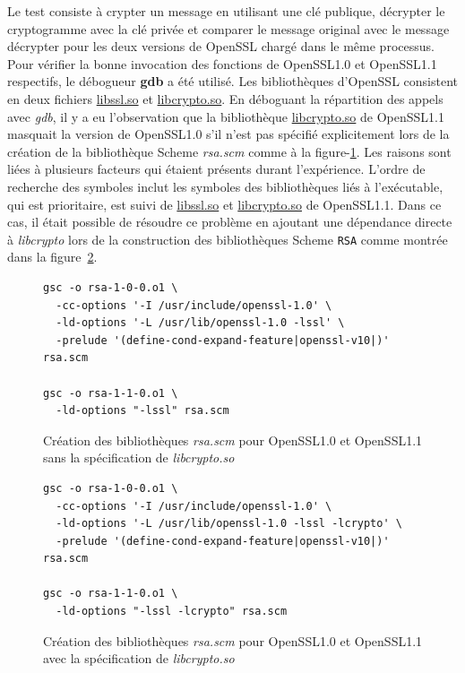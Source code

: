 Le test consiste à crypter un message en utilisant une clé publique, décrypter
le cryptogramme avec la clé privée et comparer le message original avec le
message décrypter pour les deux versions de OpenSSL chargé dans le même
processus. Pour vérifier la bonne invocation des fonctions de OpenSSL1.0 et
OpenSSL1.1 respectifs, le débogueur \textbf{gdb} a été utilisé. Les
bibliothèques d'OpenSSL consistent en deux fichiers \url{libssl.so} et
\url{libcrypto.so}.  En déboguant la répartition des appels avec \textit{gdb},
il y a eu l'observation que la bibliothèque \url{libcrypto.so} de OpenSSL1.1
masquait la version de OpenSSL1.0 s'il n'est pas spécifié explicitement lors de
la création de la bibliothèque Scheme \textit{rsa.scm} comme à la
figure-\ref{fig:scm_masq1}. Les raisons sont liées à plusieurs facteurs qui
étaient présents durant l'expérience. L'ordre de recherche des symboles inclut
les symboles des bibliothèques liés à l'exécutable, qui est prioritaire, est
suivi de \url{libssl.so} et \url{libcrypto.so} de OpenSSL1.1.  Dans ce cas, il
était possible de résoudre ce problème en ajoutant une dépendance directe à
\textit{libcrypto} lors de la construction des bibliothèques Scheme \verb+RSA+
comme montrée dans la figure~\ref{fig:scm_masq_fix1}.

\begin{center}
\begin{figure}[ht]
\begin{lstlisting}[frame=single]
gsc -o rsa-1-0-0.o1 \
  -cc-options '-I /usr/include/openssl-1.0' \
  -ld-options '-L /usr/lib/openssl-1.0 -lssl' \
  -prelude '(define-cond-expand-feature|openssl-v10|)' rsa.scm

gsc -o rsa-1-1-0.o1 \
  -ld-options "-lssl" rsa.scm
\end{lstlisting}
\caption{Création des bibliothèques \textit{rsa.scm} pour OpenSSL1.0 et OpenSSL1.1
sans la spécification de \textit{libcrypto.so}}
\label{fig:scm_masq1}
\end{figure}
\end{center}

\begin{center}
\begin{figure}[ht]
\begin{lstlisting}[frame=single]
gsc -o rsa-1-0-0.o1 \
  -cc-options '-I /usr/include/openssl-1.0' \
  -ld-options '-L /usr/lib/openssl-1.0 -lssl -lcrypto' \
  -prelude '(define-cond-expand-feature|openssl-v10|)' rsa.scm

gsc -o rsa-1-1-0.o1 \
  -ld-options "-lssl -lcrypto" rsa.scm
\end{lstlisting}
\caption{Création des bibliothèques \textit{rsa.scm} pour OpenSSL1.0 et OpenSSL1.1
avec la spécification de \textit{libcrypto.so}}
\label{fig:scm_masq_fix1}
\end{figure}
\end{center}

